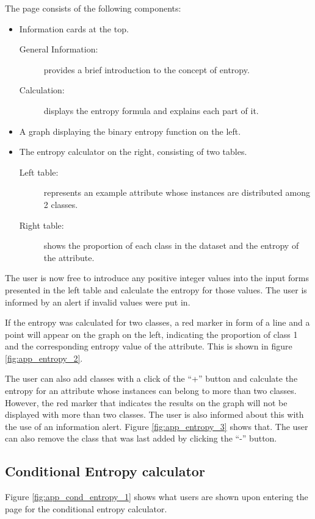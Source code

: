 The page consists of the following components:
\begin{itemize}
    \item Information cards at the top.
    \begin{description}
        \item[General Information:] provides a brief introduction to the concept of entropy.
        \item[Calculation:] displays the entropy formula and explains each part of it.
    \end{description}
    \item A graph displaying the binary entropy function on the left.
    \item The entropy calculator on the right, consisting of two tables.
    \begin{description}
        \item[Left table:] represents an example attribute whose instances are distributed among 2 classes.
        \item[Right table:] shows the proportion of each class in the dataset and the entropy of the attribute.
    \end{description}
\end{itemize}

The user is now free to introduce any positive integer values into the input forms presented in the left table and calculate the entropy for those values. The user is informed by an alert if invalid values were put in.

If the entropy was calculated for two classes, a red marker in form of a line and a point will appear on the graph on the left, indicating the proportion of class 1 and the corresponding entropy value of the attribute. This is shown in figure \ref{fig:app_entropy_2}.

The user can also add classes with a click of the ``+'' button and calculate the entropy for an attribute whose instances can belong to more than two classes. However, the red marker that indicates the results on the graph will not be displayed with more than two classes. The user is also informed about this with the use of an information alert. Figure \ref{fig:app_entropy_3} shows that.
The user can also remove the class that was last added by clicking the ``-'' button.

\subsection{Conditional Entropy calculator}
Figure \ref{fig:app_cond_entropy_1} shows what users are shown upon entering the page for the conditional entropy calculator.

